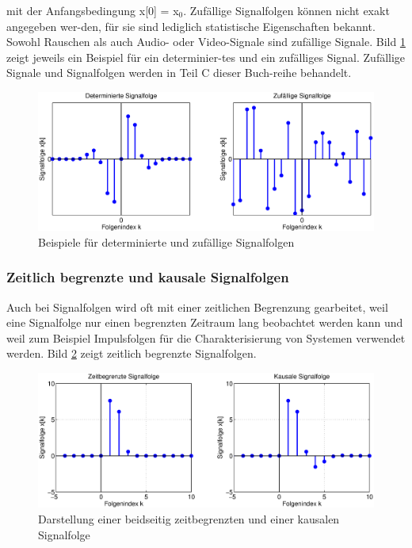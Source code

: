 \noindent mit der Anfangsbedingung x[0] = x$_{0}$. Zufällige Signalfolgen können nicht exakt angegeben wer-den, für sie sind lediglich statistische Eigenschaften bekannt. Sowohl Rauschen als auch Audio- oder Video-Signale sind zufällige Signale. Bild \ref{fig:DeterminierteZufaelligeFolgen} zeigt jeweils ein Beispiel für ein determinier-tes und ein zufälliges Signal. Zufällige Signale und Signalfolgen werden in Teil C dieser Buch-reihe behandelt.

\begin{figure}[H]
  \centerline{\includegraphics[width=1\textwidth]{Kapitel3/Bilder/image3.eps}}
  \caption{Beispiele für determinierte und zufällige Signalfolgen}
  \label{fig:DeterminierteZufaelligeFolgen}
\end{figure}

\subsubsection{Zeitlich begrenzte und kausale Signalfolgen}

\noindent Auch bei Signalfolgen wird oft mit einer zeitlichen Begrenzung gearbeitet, weil eine Signalfolge nur einen begrenzten Zeitraum lang beobachtet werden kann und weil zum Beispiel Impulsfolgen für die Charakterisierung von Systemen verwendet werden. Bild \ref{fig:BegrenzteKausaleFolgen} zeigt zeitlich begrenzte Signalfolgen.
\clearpage
\begin{figure}[H]
  \centerline{\includegraphics[width=1\textwidth]{Kapitel3/Bilder/image4.eps}}
  \caption{Darstellung einer beidseitig zeitbegrenzten und einer kausalen Signalfolge}
  \label{fig:BegrenzteKausaleFolgen}
\end{figure}

